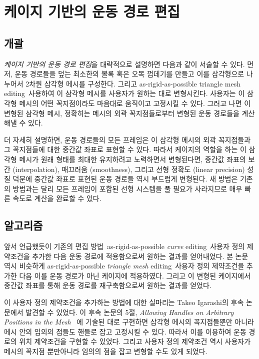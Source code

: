 \documentclass[12pt,a4paper,oneside,final]{report}
\newcommand{\Kim}{\cite{Kim:2009:SMM:1531326.1531385}}
\newcommand{\Igarashi}{\cite{Igarashi:2005:ASM:1073204.1073323}}
\begin{document}
\chapter{케이지 기반의 운동 경로 편집}
\section{개괄}
\emph{케이지 기반의 운동 경로 편집}을 대략적으로 설명하면 다음과 같이 서술할 수 있다.
먼저, 운동 경로들을 덮는 최소한의 볼록 혹은 오목 껍데기를 만들고 이를
삼각형으로 나누어서 2차원 삼각형 메시를 구성한다. 그리고 as-rigid-as-possible
triangle mesh editing~ 사용하여 이 삼각형 메시를 사용자가 원하는
대로 변형시킨다. 사용자는 이 삼각형 메시의 어떤 꼭지점이라도 마음대로 움직이고
고정시킬 수 있다. 그러고 나면 이 변형된 삼각형 메시, 정확히는 메시의 외곽
꼭지점들로부터 변형된 운동 경로들을 계산해낼 수 있다.

더 자세히 설명하면, 운동 경로들의 모든 프레임은 이 삼각형 메시의 외곽
꼭지점들과 그 꼭지점들에 대한 중간값 좌표로 표현할 수 있다. 따라서 케이지의
역할을 하는 이 삼각형 메시가 원래 형태를 최대한 유지하려고 노력하면서
변형된다면, 중간값 좌표의 보간 (interpolation), 매끄러움 (smoothness), 그리고
선형 정확도 (linear precision) 성질 덕분에 중간값 좌표로 표현된 운동 경로들
역시 부드럽게 변형된다. 새 방법은 기존의 방법과는 달리 모든 프레임이 포함된
선형 시스템을 풀 필요가 사라지므로 매우 빠른 속도로 계산을 완료할 수 있다.

\section{알고리즘}
앞서 언급했듯이 기존의 편집 방법~ as-rigid-as-possible \emph{curve}
editing~ 사용자 정의 제약조건을 추가한 다음 운동 경로에 적용함으로써
원하는 결과를 얻어내었다.  본 논문 역시 비슷하게 as-rigid-as-possible
\emph{triangle mesh} editing~ 사용자 정의 제약조건을 추가한 다음
이를 운동 경로가 아닌 케이지에 적용하였다. 그리고 이 변형된 케이지에서 중간값
좌표를 통해 운동 경로를 재구축함으로써 원하는 결과를 얻었다.

이 사용자 정의 제약조건을 추가하는 방법에 대한 실마리는 Takeo Igarashi의 후속
논문에서 발견할 수 있었다. 이 후속 논문의 5절, \emph{Allowing Handles on
Arbitrary Positions in the
Mesh}~\cite[p.26]{doi:10.1080/2151237X.2009.10129273} 에 기술된 대로 구현하면
삼각형 메시의 꼭지점들뿐만 아니라 메시 안의 임의의 점들도 핸들로 잡고 고정시킬
수 있다.  따라서 이를 이용하여 운동 경로의 위치 제약조건을 구현할 수 있었다.
그리고 사용자 정의 제약조건 역시 사용자가 메시의 꼭지점 뿐만아니라 임의의 점을
잡고 변형할 수도 있게 되었다.
\end{document}
